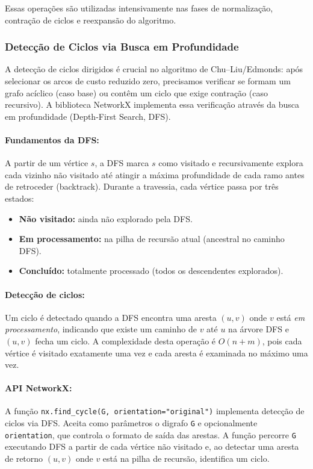 Essas operações são utilizadas intensivamente nas fases de normalização, contração de ciclos e reexpansão do algoritmo.

\subsubsection{Detecção de Ciclos via Busca em Profundidade}
\label{sec:dfs}

A detecção de ciclos dirigidos é crucial no algoritmo de Chu--Liu/Edmonds: após selecionar os arcos de custo reduzido zero, precisamos verificar se formam um grafo acíclico (caso base) ou contêm um ciclo que exige contração (caso recursivo). A biblioteca NetworkX implementa essa verificação através da busca em profundidade (Depth-First Search, DFS).

\paragraph{Fundamentos da DFS:} A partir de um vértice \(s\), a DFS marca \(s\) como visitado e recursivamente explora cada vizinho não visitado até atingir a máxima profundidade de cada ramo antes de retroceder (backtrack). Durante a travessia, cada vértice passa por três estados:
\begin{itemize}\setlength{\itemsep}{2pt}
    \item \textbf{Não visitado:} ainda não explorado pela DFS.
    \item \textbf{Em processamento:} na pilha de recursão atual (ancestral no caminho DFS).
    \item \textbf{Concluído:} totalmente processado (todos os descendentes explorados).
\end{itemize}

\paragraph{Detecção de ciclos:} Um ciclo é detectado quando a DFS encontra uma aresta \((u,v)\) onde \(v\) está \emph{em processamento}, indicando que existe um caminho de \(v\) até \(u\) na árvore DFS e \((u,v)\) fecha um ciclo. A complexidade desta operação é \(O(n+m)\), pois cada vértice é visitado exatamente uma vez e cada aresta é examinada no máximo uma vez.

\paragraph{API NetworkX:} A função \texttt{nx.find\_cycle(G, orientation="original")} implementa detecção de ciclos via DFS. Aceita como parâmetros o digrafo \texttt{G} e opcionalmente \texttt{orientation}, que controla o formato de saída das arestas. A função percorre \texttt{G} executando DFS a partir de cada vértice não visitado e, ao detectar uma aresta de retorno \((u,v)\) onde \(v\) está na pilha de recursão, identifica um ciclo.

